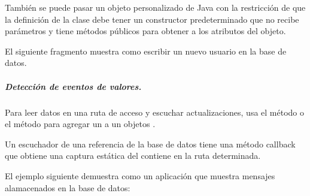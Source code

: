 También se puede pasar un objeto personalizado de Java con la restricción
de que la definición de la clase debe tener un constructor predeterminado
que no recibe parámetros y tiene métodos públicos para obtener a los atributos
del objeto.

El siguiente fragmento muestra como escribir un nuevo usuario en la base de
datos.

%
\begin{sphinxVerbatim}[commandchars=\\\{\}]
      
    
\end{sphinxVerbatim}


\subparagraph{Detección de eventos de valores.}
\label{\detokenize{dev_docs:detecteccion-eventos-de-valores}}
Para leer datos en una ruta de acceso y escuchar actualizaciones, usa el
método  o el método 
para agregar un  a un objetos .

Un escuchador  de una referencia de la base de datos
tiene una método callback  que obtiene una captura estática
del contiene en la ruta determinada.

El ejemplo siguiente demuestra como un aplicación que muestra mensajes
alamacenados en la base de datos:

%
\begin{sphinxVerbatim}[commandchars=\\\{\}]
 
      
       
\end{sphinxVerbatim}


